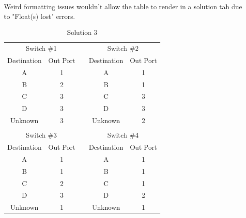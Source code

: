 \documentclass[12pt,addpoints,answers]{exam}
\begin{document}
\begin{questions}
\begin{solution}
	Weird formatting issues wouldn't allow the table to render in a solution tab due to "Float(s) lost" errors.
	\begin{table}[]
		\centering
		\caption{Solution 3}
		\label{Table 1}
		\begin{tabular}{|c|c|c|c|c|}
			\cline{1-2} \cline{4-5}
			\multicolumn{2}{|c|}{Switch \#1} & \multirow{7}{*}{} & \multicolumn{2}{c|}{Switch \#2} \\ \cline{1-2} \cline{4-5} 
			Destination      & Out Port      &                   & Destination      & Out Port     \\ \cline{1-2} \cline{4-5} 
			A                & 1             &                   & A                & 1            \\
			B                & 2             &                   & B                & 1            \\
			C                & 3             &                   & C                & 3            \\
			D                & 3             &                   & D                & 3            \\
			Unknown          & 3             &                   & Unknown          & 2            \\
			\multicolumn{5}{|c|}{}                                                                 \\ \cline{1-2} \cline{4-5} 
			\multicolumn{2}{|c|}{Switch \#3} & \multirow{7}{*}{} & \multicolumn{2}{c|}{Switch \#4} \\ \cline{1-2} \cline{4-5} 
			Destination      & Out Port      &                   & Destination      & Out Port     \\ \cline{1-2} \cline{4-5} 
			A                & 1             &                   & A                & 1            \\
			B                & 1             &                   & B                & 1            \\
			C                & 2             &                   & C                & 1            \\
			D                & 3             &                   & D                & 2            \\
			Unknown          & 1             &                   & Unknown          & 1           
		\end{tabular}
	\end{table}
\end{solution}

\end{questions}
\end{document}
